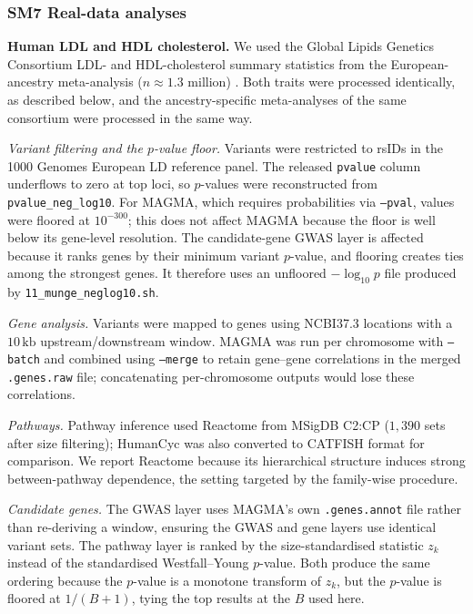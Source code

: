 \subsubsection*{SM7 Real-data analyses}

\textbf{Human LDL and HDL cholesterol.} We used the Global Lipids Genetics
Consortium LDL- and HDL-cholesterol summary statistics from the European-ancestry meta-analysis ($n\approx1.3$ million) \citep{Graham2021GLGC}. Both traits were processed identically, as described below, and the ancestry-specific meta-analyses of the same consortium were processed in the same way.

\emph{Variant filtering and the $p$-value floor.} Variants were restricted to rsIDs in the 1000 Genomes European LD reference panel. The released \texttt{pvalue} column underflows to zero at top loci, so $p$-values were reconstructed from \texttt{pvalue\_neg\_log10}. For MAGMA, which requires probabilities via \texttt{--pval}, values were floored at $10^{-300}$; this does not affect MAGMA because the floor is well below its gene-level resolution. The candidate-gene GWAS layer is affected because it ranks genes by their minimum variant $p$-value, and flooring creates ties among the strongest genes. It therefore uses an unfloored $-\log_{10}p$ file produced by \texttt{11\_munge\_neglog10.sh}.

\emph{Gene analysis.} Variants were mapped to genes using NCBI37.3 locations with a $10\,\mathrm{kb}$ upstream/downstream window. MAGMA was run per chromosome with \texttt{--batch} and combined using \texttt{--merge} to retain gene--gene correlations in the merged \texttt{.genes.raw} file; concatenating per-chromosome outputs would lose these correlations.

\emph{Pathways.} Pathway inference used Reactome from MSigDB C2:CP ($1{,}390$ sets after size filtering); HumanCyc was also converted to CATFISH format for comparison. We report Reactome because its hierarchical structure induces strong between-pathway dependence, the setting targeted by the family-wise procedure.

\emph{Candidate genes.} The GWAS layer uses MAGMA's own \texttt{.genes.annot} file rather than re-deriving a window, ensuring the GWAS and gene layers use identical variant sets. The pathway layer is ranked by the size-standardised statistic $z_k$ instead of the standardised Westfall--Young $p$-value. Both produce the same ordering because the $p$-value is a monotone transform of $z_k$, but the $p$-value is floored at $1/(B+1)$, tying the top results at the $B$ used here.

